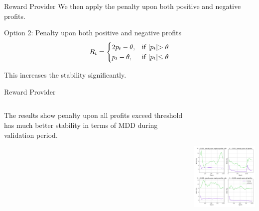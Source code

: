 \begin{frame}{Reward Provider}
We then apply the penalty upon both positive and negative profits. 
\begin{block}{Option 2: Penalty upon both positive and negative profits}
\[
R_t = 
\begin{cases}
    2p_t - \theta,&\text{if  }    $$|p_t|$$ > \theta\\
    p_t - \theta ,&\text{if  } $$|p_t|$$\leq  \theta
\end{cases}
\]
\end{block}
\alert{This increases the stability significantly.}
\end{frame}



\begin{frame}{Reward Provider}
\begin{columns}
\begin{column}{0.35\textwidth}
The results show penalty upon all profits exceed threshold has much better stability in terms of MDD during validation period. 

\end{column}
\begin{column}{0.65\textwidth}
\begin{center}
      \includegraphics[height=7cm]{images/penalty_negtive_profits_compare.png}
\end{center}
\end{column}
\end{columns}
\end{frame}


